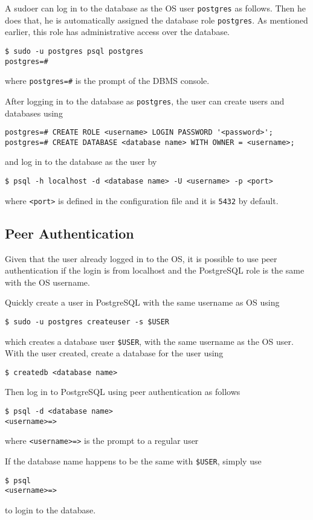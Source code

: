 A sudoer can log in to the database as the OS user \verb|postgres| as follows. Then he does that, he is automatically assigned the database role \verb|postgres|. As mentioned earlier, this role has administrative access over the database.
\begin{lstlisting}
$ sudo -u postgres psql postgres
postgres=#
\end{lstlisting}
where \verb|postgres=#| is the prompt of the DBMS console.

After logging in to the database as \verb|postgres|, the user can create users and databases using
\begin{lstlisting}
postgres=# CREATE ROLE <username> LOGIN PASSWORD '<password>';
postgres=# CREATE DATABASE <database name> WITH OWNER = <username>;
\end{lstlisting}
and log in to the database as the user by
\begin{lstlisting}
$ psql -h localhost -d <database name> -U <username> -p <port>
\end{lstlisting}
where \verb|<port>| is defined in the configuration file and it is \verb|5432| by default.

\subsection{Peer Authentication}

Given that the user already logged in to the OS, it is possible to use peer authentication if the login is from localhost and the PostgreSQL role is the same with the OS username.

Quickly create a user in PostgreSQL with the same username as OS using
\begin{lstlisting}
$ sudo -u postgres createuser -s $USER
\end{lstlisting}
which creates a database user \verb|$USER|, with the same username as the OS user. With the user created, create a database for the user using
\begin{lstlisting}
$ createdb <database name>
\end{lstlisting}
Then log in to PostgreSQL using peer authentication as follows
\begin{lstlisting}
$ psql -d <database name>
<username>=>
\end{lstlisting}
where \verb|<username>=>| is the prompt to a regular user

If the database name happens to be the same with \verb|$USER|, simply use
\begin{lstlisting}
$ psql
<username>=>
\end{lstlisting}
to login to the database.

